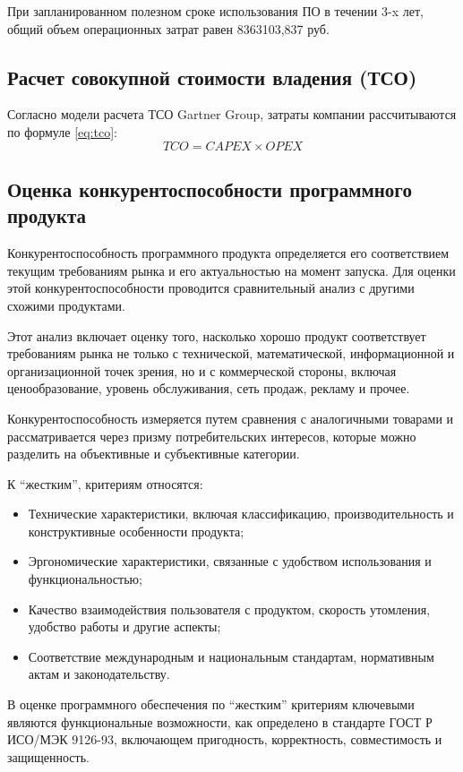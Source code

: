 При запланированном полезном сроке использования ПО в течении 3-x лет, общий объем операционных затрат равен 8363103,837 руб.

\subsection{Расчет совокупной стоимости владения (ТСО)}

Согласно модели расчета ТСО Gartner Group, затраты компании рассчитываются по формуле \ref{eq:tco}:
\begin{equation}\label{eq:tco}
	TCO = CAPEX \times OPEX
\end{equation}

\subsection{Оценка конкурентоспособности программного продукта}

Конкурентоспособность программного продукта определяется его соответствием текущим требованиям рынка и его актуальностью на момент запуска. Для оценки этой конкурентоспособности проводится сравнительный анализ с другими схожими продуктами.

Этот анализ включает оценку того, насколько хорошо продукт соответствует требованиям рынка не только с технической, математической, информационной и организационной точек зрения, но и с коммерческой стороны, включая ценообразование, уровень обслуживания, сеть продаж, рекламу и прочее.

Конкурентоспособность измеряется путем сравнения с аналогичными товарами и рассматривается через призму потребительских интересов, которые можно разделить на объективные и субъективные категории.

К “жестким”, критериям относятся:
\begin{itemize}
	\item Технические характеристики, включая классификацию, производительность и конструктивные особенности продукта;
	\item Эргономические характеристики, связанные с удобством использования и функциональностью;
	\item Качество взаимодействия пользователя с продуктом, скорость утомления, удобство работы и другие аспекты;
	\item Соответствие международным и национальным стандартам, нормативным актам и законодательству.
\end{itemize}

В оценке программного обеспечения по “жестким” критериям ключевыми являются функциональные возможности, как определено в стандарте ГОСТ Р ИСО/МЭК 9126-93, включающем пригодность, корректность, совместимость и защищенность.

